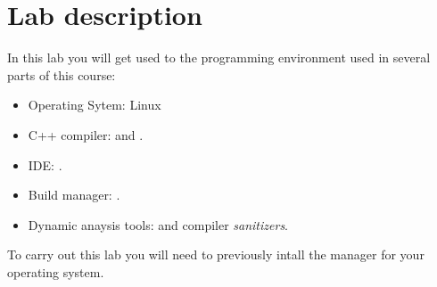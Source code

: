 \section{Lab description}

In this lab you will get used to the programming environment used in 
several parts of this course:

\begin{itemize}

  \item Operating Sytem: Linux

  \item C++ compiler:  and .

  \item IDE: .

  \item Build manager: .

  \item Dynamic anaysis tools: 
         and 
        compiler \emph{sanitizers}.

\end{itemize}

To carry out this lab you will need to previously intall the  manager for your operating system.
